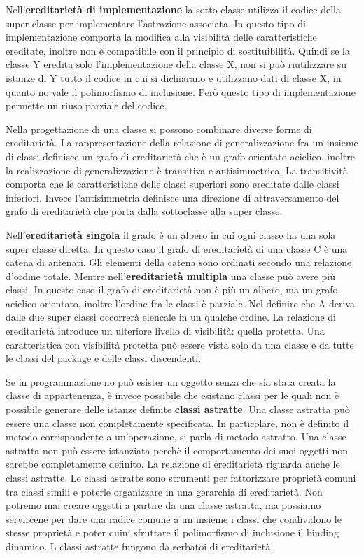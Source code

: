 \documentclass[a4paper,18pt]{extarticle}
\begin{document}
Nell'\textbf{ereditarietà di implementazione} la sotto classe utilizza il codice della super classe per implementare l'astrazione associata. In questo tipo di implementazione comporta la modifica alla visibilità delle caratteristiche ereditate, inoltre non è compatibile con il principio di sostituibilità. Quindi se la classe Y eredita solo l'implementazione della classe X, non si può riutilizzare su istanze di Y tutto il codice in cui si dichiarano e utilizzano dati di classe X, in quanto no vale il polimorfismo di inclusione. Però questo tipo di implementazione permette un riuso parziale del codice.

Nella progettazione di una classe si possono combinare diverse forme di ereditarietà. La rappresentazione della relazione di generalizzazione fra un insieme di classi definisce un grafo di ereditarietà che è un grafo orientato aciclico, inoltre la realizzazione di generalizzazione è transitiva e antisimmetrica. La transitività comporta che le caratteristiche delle classi superiori sono ereditate dalle classi inferiori. Invece l'antisimmetria definisce una direzione di attraversamento del grafo di ereditarietà che porta dalla sottoclasse alla super classe.

Nell'\textbf{ereditarietà singola} il grado è un albero in cui ogni classe ha una sola super classe diretta. In questo caso il grafo di ereditarietà di una classe C è una catena di antenati. Gli elementi della catena sono ordinati secondo una relazione d'ordine totale. Mentre nell'\textbf{ereditarietà multipla} una classe può avere più classi. In questo caso il grafo di ereditarietà non è più un albero, ma un grafo aciclico orientato, inoltre l'ordine fra le classi è parziale. Nel definire che A deriva dalle due super classi occorrerà elencale in un qualche ordine. La relazione di ereditarietà introduce un ulteriore livello di visibilità: quella protetta. Una caratteristica con visibilità protetta può essere vista solo da una classe e da tutte le classi del package e delle classi discendenti.

Se in programmazione no può esister un oggetto senza che sia stata creata la classe di appartenenza, è invece possibile che esistano classi per le quali non è possibile generare delle istanze definite \textbf{classi astratte}. Una classe astratta può essere una classe non completamente specificata. In particolare, non è definito il metodo corrispondente a un'operazione, si parla di metodo astratto. Una classe astratta non può essere istanziata perchè il comportamento dei suoi oggetti non sarebbe completamente definito. La relazione di ereditarietà riguarda anche le classi astratte. Le classi astratte sono strumenti per fattorizzare proprietà comuni tra classi simili e poterle organizzare in una gerarchia di ereditarietà. Non potremo mai creare oggetti a partire da una classe astratta, ma possiamo servircene per dare una radice comune a un insieme i classi che condividono le stesse proprietà e poter quini sfruttare il polimorfismo di inclusione il binding dinamico. L classi astratte fungono da serbatoi di ereditarietà.
\end{document}
